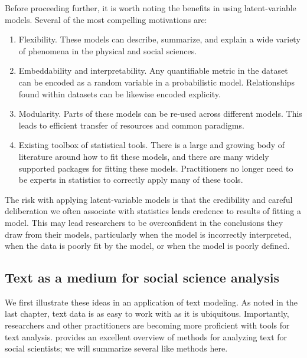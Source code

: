 Before proceeding further, it is worth noting the benefits in using
latent-variable models.  Several of the most compelling motivations are:

\begin{enumerate}
\item Flexibility. These models can describe, summarize, and explain
  a wide variety of phenomena in the physical and social sciences.
\item Embeddability and interpretability.  Any quantifiable metric
  in the dataset can be encoded as a random variable in a
  probabilistic model.  Relationships
  found within datasets can be likewise encoded
  explicity. \label{lvm:matching}
\item Modularity. Parts of these models can be re-used across
  different models.  This leads to efficient transfer of resources
  and common paradigms.
\item Existing toolbox of statistical tools. There is a large and
  growing body of literature around how to fit these models, and
  there are many widely supported packages for fitting these
  models.  Practitioners no longer need to be experts in
  statistics to correctly apply many of these tools.
\end{enumerate}

  The risk with applying latent-variable models is that the
  credibility and careful deliberation we often associate with
  statistics lends credence to results of fitting a model.  This may
  lead researchers to be overconfident in the conclusions they draw
  from their models, particularly when the model is incorrectly
  interpreted, when the data is poorly fit by the model, or when the
  model is poorly defined.

\subsection{Text as a medium for social science analysis}
  \label{sec:text_intro}
  We first illustrate these ideas in an application of text modeling.
  As noted in the last chapter, text data is as easy to work with as
  it is ubiquitous. Importantly, researchers and other practitioners
  are becoming more proficient with tools for text analysis.
  \cite{grimmer:submitted} provides an excellent overview of methods
  for analyzing text for social scientists; we will summarize several
  like methods here.

  
